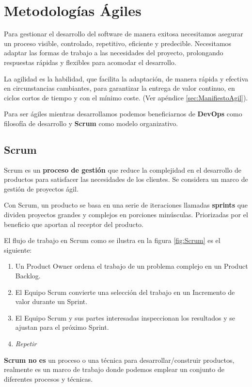 \documentclass[12pt,twoside,titlepage]{report}
\begin{document}
\chapter{Metodologías Ágiles}

Para gestionar el desarrollo del software de manera exitosa necesitamos asegurar un proceso visible, controlado, repetitivo, eficiente y predecible. Necesitamos adaptar las formas de trabajo a las necesidades del proyecto, prolongando respuestas rápidas y flexibles para acomodar el desarrollo.

La agilidad es la habilidad, que facilita la adaptación, de manera rápida y efectiva en circunstancias cambiantes, para garantizar la entrega de valor continuo, en ciclos cortos de tiempo y con el mínimo coste. (Ver apéndice \ref{sec:ManifiestoAgil}).

Para ser ágiles mientras desarrollamos podemos beneficiarnos de \textbf{DevOps} como filosofía de desarrollo y \textbf{Scrum} como modelo organizativo.

\section{Scrum}

Scrum es un \textbf{proceso de gestión} que reduce la complejidad en el desarrollo de productos para satisfacer las necesidades de los clientes. Se considera un marco de gestión de proyectos ágil.

Con Scrum, un producto se basa en una serie de iteraciones llamadas \textbf{sprints} que dividen proyectos grandes y complejos en porciones minúsculas. Priorizadas por el beneficio que aportan al receptor del producto.

El flujo de trabajo en Scrum como se ilustra en la figura \ref{fig:Scrum} es el siguiente:

\begin{enumerate}
    \item Un Product Owner ordena el trabajo de un problema complejo en un Product Backlog.
    \item El Equipo Scrum convierte una selección del trabajo en un Incremento de valor durante un Sprint.
    \item El Equipo Scrum y sus partes interesadas inspeccionan los resultados y se ajustan para el próximo Sprint.
    \item \textit{Repetir}
\end{enumerate}

\textbf{Scrum no es} un proceso o una técnica para desarrollar/construir productos, realmente es un marco de trabajo donde podemos emplear un conjunto de diferentes procesos y técnicas.
\end{document}
